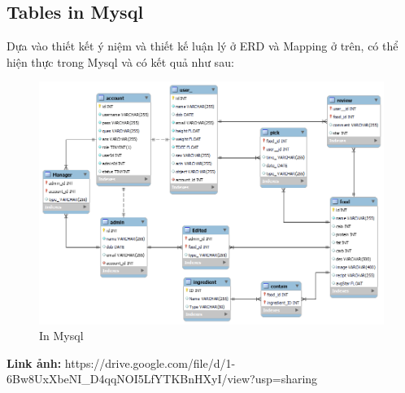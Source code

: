     \subsection{Tables in Mysql}
    Dựa vào thiết kết ý niệm và thiết kế luận lý ở ERD và Mapping ở trên, có thể hiện thực trong Mysql và có kết quả như sau:
        \begin{figure}[h]
            \centering
            \includegraphics[width=0.99\linewidth]{images/backendDB/sqltable.png}
            \caption{In Mysql}
        \end{figure}
        \textbf{Link ảnh:} https://drive.google.com/file/d/1-6Bw8UxXbeNI\_D4qqNOI5LfYTKBnHXyI/view?usp=sharing